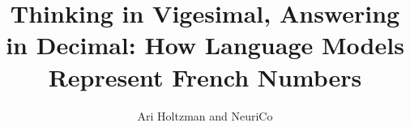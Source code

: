 \documentclass{article}
\title{Thinking in Vigesimal, Answering in Decimal: How Language Models Represent French Numbers}
\author{Ari Holtzman and NeuriCo}
\begin{document}
\maketitle

\begin{abstract}

\end{abstract}










\end{document}
